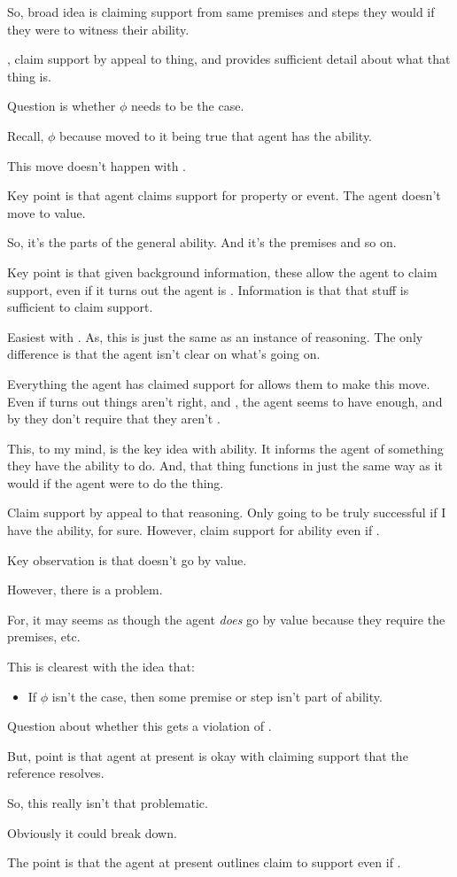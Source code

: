 \begin{note}
  So, broad idea is claiming support from same premises and steps they would if they were to witness their ability.

  \ur{}, claim support by appeal to thing, and \WR{} provides sufficient detail about what that thing is.

  Question is whether \(\phi\) needs to be the case.

  Recall, \(\phi\) because moved to it being true that agent has the ability.

  This move doesn't happen with \ur{}.


  Key point is that agent claims support for property or event.
  The agent doesn't move to value.

  So, \gsi{} it's the parts of the general ability.
  And  it's the premises and so on.

  Key point is that given background information, these allow the agent to claim support, even if it turns out the agent is \mom{}.
  Information is that that stuff is sufficient to claim support.

  Easiest with \WR{}.
  As, this is just the same as an instance of reasoning.
  The only difference is that the agent isn't clear on what's going on.

  Everything the agent has claimed support for allows them to make this move.
  Even if turns out things aren't right, and \mom{}, the agent seems to have enough, and by \ur{} they don't require that they aren't \mom{}.

  This, to my mind, is the key idea with ability.
  It informs the agent of something they have the ability to do.
  And, that thing functions in just the same way as it would if the agent were to do the thing.

  Claim support by appeal to that reasoning.
  Only going to be truly successful if I have the ability, for sure.
  However, claim support for ability even if \mom{}.
\end{note}

\begin{note}
  Key observation is that \ur{} doesn't go by value.

  However, there is a problem.

  For, it may seems as though the agent \emph{does} go by value because they require the premises, etc.

  This is clearest with the idea that:
  \begin{itemize}
  \item If \(\phi\) isn't the case, then some premise or step isn't part of ability.
  \end{itemize}
  Question about whether this gets a violation of \eiS{}.

  But, point is that agent at present is okay with claiming support that the reference resolves.

  So, this really isn't that problematic.

  Obviously it could break down.

  The point is that the agent at present outlines claim to support even if \mom{}.
\end{note}


